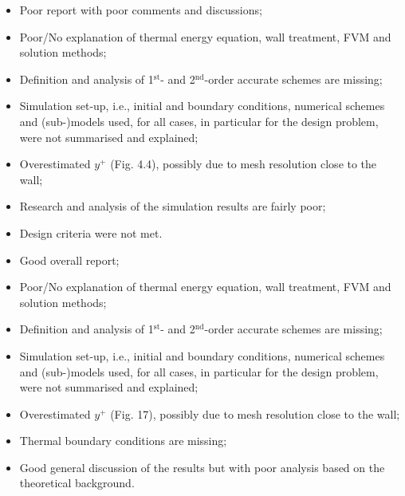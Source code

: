 \documentclass[14pt,twoside]{report}
\newcommand\blankpage{%
    \null
    \thispagestyle{empty}%
    \addtocounter{page}{-1}%
    \newpage}
\begin{document}
\clearpage 


\bigskip


\medskip

  \begin{itemize}
%
     \item Poor report with poor comments and discussions;
     \item Poor/No explanation of thermal energy equation, wall treatment, FVM and solution methods;
     \item Definition and analysis of 1$^{\text{st}}$- and 2$^{\text{nd}}$-order accurate schemes are missing;
     \item Simulation set-up, i.e., initial and boundary conditions, numerical schemes and (sub-)models used, for all cases, in particular for the design problem, were not summarised and explained;
     \item Overestimated $y^{+}$ (Fig. 4.4), possibly due to mesh resolution close to the wall;
     \item Research and analysis of the simulation results are fairly poor;
     \item Design criteria were not met.
%
  \end{itemize}%

\clearpage 



\bigskip


\medskip

  \begin{itemize}
%
     \item Good overall report;
     \item Poor/No explanation of thermal energy equation, wall treatment, FVM and solution methods;
     \item Definition and analysis of 1$^{\text{st}}$- and 2$^{\text{nd}}$-order accurate schemes are missing;
     \item Simulation set-up, i.e., initial and boundary conditions, numerical schemes and (sub-)models used, for all cases, in particular for the design problem, were not summarised and explained;
     \item Overestimated $y^{+}$ (Fig. 17), possibly due to mesh resolution close to the wall;
     \item Thermal boundary conditions are missing;
     \item Good general discussion of the results but with poor analysis based on the theoretical background.
%
  \end{itemize}%
\end{document}
